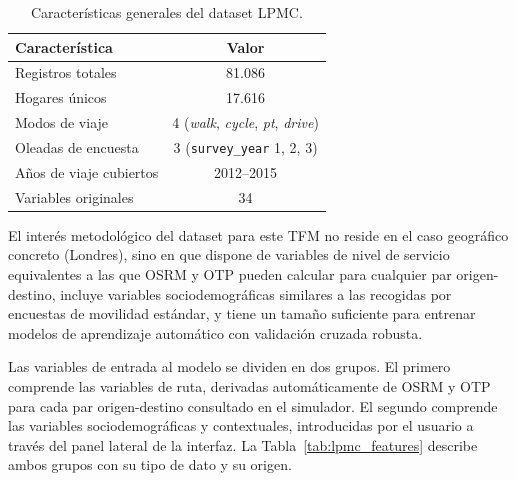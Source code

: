 \begin{table}[htbp]
  \caption{Características generales del dataset LPMC.}
  \label{tab:lpmc_dataset_stats}
  \centering
  \begin{tabular}{lc}
    \toprule
    \textbf{Característica} & \textbf{Valor} \\
    \midrule
    Registros totales        & 81.086 \\
    Hogares únicos           & 17.616 \\
    Modos de viaje           & 4 (\textit{walk}, \textit{cycle}, \textit{pt}, \textit{drive}) \\
    Oleadas de encuesta      & 3 (\texttt{survey\_year} 1, 2, 3) \\
    Años de viaje cubiertos  & 2012--2015 \\
    Variables originales     & 34 \\
    \bottomrule
  \end{tabular}
\end{table}

El interés metodológico del dataset para este TFM no reside en el caso geográfico concreto (Londres), sino en que dispone de variables de nivel de servicio equivalentes a las que OSRM y OTP pueden calcular para cualquier par origen-destino, incluye variables sociodemográficas similares a las recogidas por encuestas de movilidad estándar, y tiene un tamaño suficiente para entrenar modelos de aprendizaje automático con validación cruzada robusta.

Las variables de entrada al modelo se dividen en dos grupos. El primero comprende las variables de ruta, derivadas automáticamente de OSRM y OTP para cada par origen-destino consultado en el simulador. El segundo comprende las variables sociodemográficas y contextuales, introducidas por el usuario a través del panel lateral de la interfaz. La Tabla~\ref{tab:lpmc_features} describe ambos grupos con su tipo de dato y su origen.

